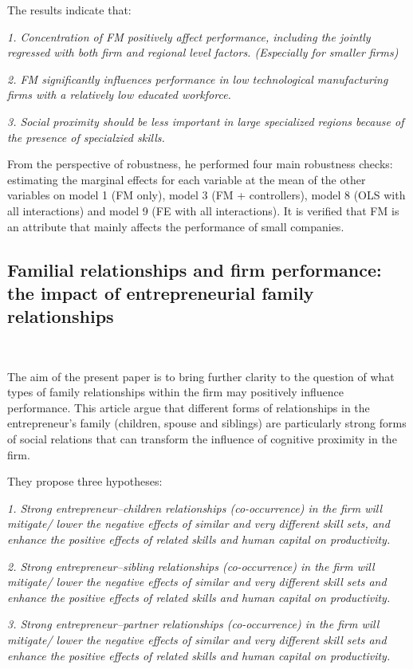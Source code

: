 \documentclass{article}
\begin{document}
    The results indicate that:

    \emph{1. Concentration of FM positively affect performance, including the jointly regressed with both firm and regional level factors. (Especially for smaller firms)}

    \emph{2. FM significantly influences performance in low technological manufacturing firms with a relatively low educated workforce. }

    \emph{3. Social proximity should be less important in large specialized regions because of the presence of specialzied skills.}

    From the perspective of robustness, he performed four main robustness checks: estimating the marginal effects 
    for each variable at the mean of the other variables on model 1 (FM only), 
    model 3 (FM + controllers), model 8 (OLS with all interactions) and model 9 (FE with all interactions). 
    It is verified that FM is an attribute that mainly affects the performance of small companies.


\subsection{Familial relationships and firm performance: the impact of entrepreneurial family relationships}
    ~\

    The aim of the present paper is to bring further clarity to the question of what types of family relationships within the firm may positively influence performance. 
    This article argue that different forms of relationships in the entrepreneur's family (children, spouse and siblings) are particularly strong forms of social relations that can transform the 
    influence of cognitive proximity in the firm.

    They propose three hypotheses: 
    
    \emph{1. Strong entrepreneur–children relationships (co-occurrence) in the firm will mitigate/ lower the negative effects of similar and very different skill sets, and enhance the positive effects of related skills and human capital on productivity.}
    
    \emph{2. Strong entrepreneur–sibling relationships (co-occurrence) in the firm will mitigate/ lower the negative effects of similar and very different skill sets and enhance the positive effects of related skills and human capital on productivity.}

    \emph{3. Strong entrepreneur–partner relationships (co-occurrence) in the firm will mitigate/ lower the negative effects of similar and very different skill sets and enhance the positive effects of related skills and human capital on productivity.}
\end{document}
